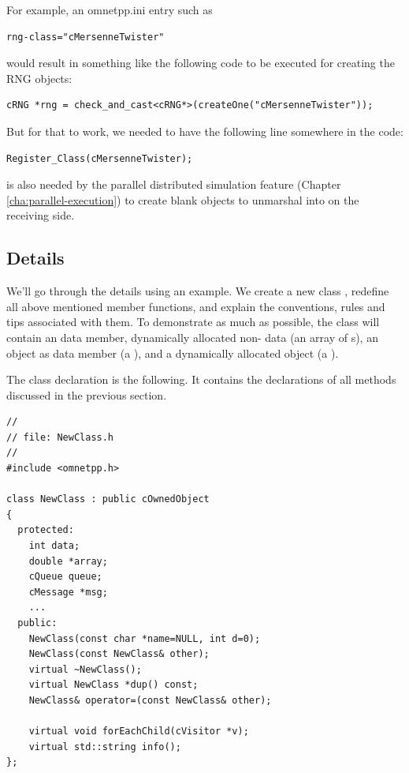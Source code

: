 For example, an omnetpp.ini entry such as

\begin{verbatim}
rng-class="cMersenneTwister"
\end{verbatim}

would result in something like the following code to be executed
for creating the RNG objects:

\begin{verbatim}
cRNG *rng = check_and_cast<cRNG*>(createOne("cMersenneTwister"));
\end{verbatim}

But for that to work, we needed to have the following line somewhere in the code:

\begin{verbatim}
Register_Class(cMersenneTwister);
\end{verbatim}

 is also needed by the parallel distributed simulation feature
(Chapter \ref{cha:parallel-execution}) to create blank objects to unmarshal into
on the receiving side.


\subsection{Details}

We'll go through the details using an example. We create a new
class , redefine all above mentioned 
member functions, and explain the conventions, rules and tips
associated with them.
To demonstrate as much as possible, the class will contain
an  data member, dynamically allocated non- data
(an array of s),
an {\opp} object as data member (a ), and
a dynamically allocated {\opp} object (a ).

The class declaration is the following. It contains the declarations
of all methods discussed in the previous section.

\begin{verbatim}
//
// file: NewClass.h
//
#include <omnetpp.h>

class NewClass : public cOwnedObject
{
  protected:
    int data;
    double *array;
    cQueue queue;
    cMessage *msg;
    ...
  public:
    NewClass(const char *name=NULL, int d=0);
    NewClass(const NewClass& other);
    virtual ~NewClass();
    virtual NewClass *dup() const;
    NewClass& operator=(const NewClass& other);

    virtual void forEachChild(cVisitor *v);
    virtual std::string info();
};
\end{verbatim}

